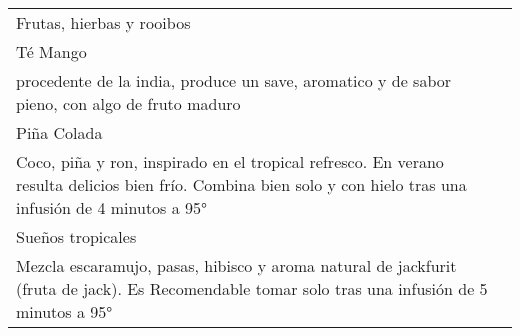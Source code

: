 \documentclass[12pt]{article}
\makeatletter
\newcommand*\ColText[1]{\textcolor{Goldenrod3}{#1}}
\newenvironment{Group}[1]
{\noindent\begin{tabular*}{\textwidth}{@{}p{1\linewidth}@{\extracolsep{\fill}}r@{}}
{\fontsize{24}{29}\selectfont\ColText{#1}}
              \\[0.8em]}
              {
\end{tabular*}}
\newcommand*\Entry[1]{%
    \sffamily#1}
\newcommand*\Expl[1]{%
    \hspace*{1em}\footnotesize #1}
\makeatother
\begin{document}
    \begin{Group}{Frutas, hierbas y rooibos}
        \Entry{Té Mango} \\
        \Expl{procedente de la india, produce un save, aromatico y de sabor pieno, con algo de fruto maduro} \\
        \Entry{Piña Colada} \\
        \Expl{Coco, piña y ron, inspirado en el tropical refresco. En verano resulta delicios bien frío. Combina bien solo y con hielo tras una infusión de 4 minutos a 95°} \\
        \Entry{Sueños tropicales} \\
        \Expl{Mezcla escaramujo, pasas, hibisco y aroma natural de jackfurit (fruta de jack). Es Recomendable tomar solo tras una infusión de 5 minutos a 95°} \\

    \end{Group}

    \vfill
\end{document}
